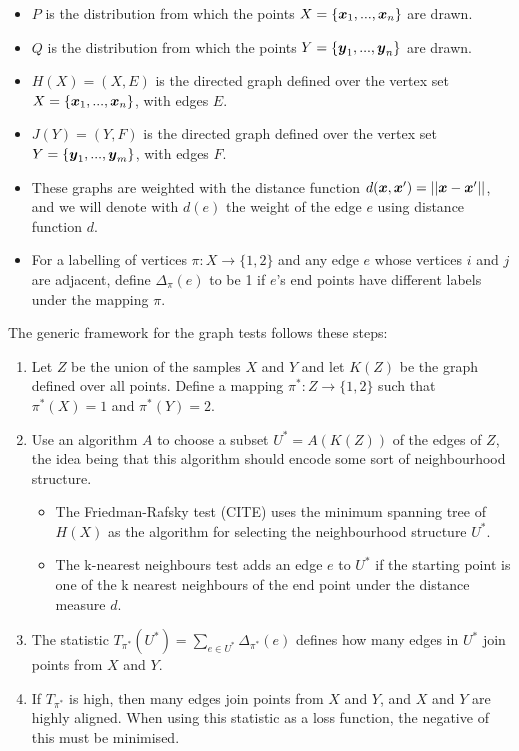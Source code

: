 \begin{itemize}
    \item $P$ is the distribution from which the points $X = \{\boldsymbol{x}_1, ..., \boldsymbol{x}_n \}$ are drawn.
    \item $Q$ is the distribution from which the points $Y = \{\boldsymbol{y}_1, ..., \boldsymbol{y}_n \}$ are drawn.
    \item $H(X) = (X, E)$ is the directed graph defined over the vertex set $X = \{\boldsymbol{x}_1, ..., \boldsymbol{x}_n \}$, with edges $E$.
    \item $J(Y) = (Y, F) $ is the directed graph defined over the vertex set $Y = \{\boldsymbol{y}_1, ..., \boldsymbol{y}_m \}$, with edges $F$. 
    \item These graphs are weighted with the distance function $d(\boldsymbol{x}, \boldsymbol{x}') = || \boldsymbol{x} - \boldsymbol{x}'||$, and we will denote with $d(e)$ the weight of the edge $e$ using distance function $d$. 
    \item For a labelling of vertices $\pi: X \rightarrow \{1, 2\}$ and any edge $e$ whose vertices $i$ and $j$ are adjacent, define $\Delta_{\pi}(e)$ to be 1 if $e$'s end points have different labels under the mapping $\pi$. 
\end{itemize}

The generic framework for the graph tests follows these steps:

\begin{enumerate}
    \item Let $Z$ be the union of the samples $X$ and $Y$ and let $K(Z)$ be the graph defined over all points. Define a mapping $\pi^* : Z \rightarrow \{1, 2\}$ such that $\pi^*(X) = 1$ and $\pi^*(Y) = 2$.
    \item Use an algorithm $A$ to choose a subset $U^* = A(K(Z))$ of the edges of $Z$, the idea being that this algorithm should encode some sort of neighbourhood structure.
    \begin{itemize}
        \item The Friedman-Rafsky test (CITE) uses the minimum spanning tree of $H(X)$ as the algorithm for selecting the neighbourhood structure $U^*$. 

        \item The k-nearest neighbours test adds an edge $e$ to $U^*$ if the starting point is one of the k nearest neighbours of the end point under the distance measure $d$.
    \end{itemize}
    \item The statistic $T_{\pi^*}(U^*) = \sum_{e \in U^*} \Delta_{\pi^*} (e)$ defines how many edges in $U^*$ join points from $X$ and $Y$. 
    \item If $T_{\pi^*}$ is high, then many edges join points from $X$ and $Y$, and $X$ and $Y$ are highly aligned. When using this statistic as a loss function, the negative of this must be minimised.
\end{enumerate}

